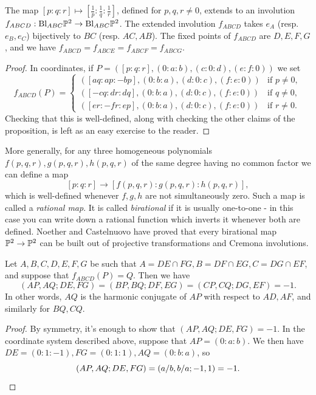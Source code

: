 \begin{prop} The map $[p:q:r]\mapsto [\frac{1}{p}:\frac{1}{q}:\frac{1}{r}]$, defined for $p,q,r \ne 0$, extends to an involution $f_{ABCD} : \text{\rm Bl}_{ABC}\mathbb{P}^2 \rightarrow \text{\rm Bl}_{ABC}\mathbb{P}^2$. The extended involution $f_{ABCD}$ takes $e_A$ (resp. $e_B, e_C$) bijectively to $BC$ (resp. $AC, AB$). The fixed points of $f_{ABCD}$ are $D,E,F,G$, and we have $f_{ABCD} = f_{ABCE} = f_{ABCF} = f_{ABCG}$.
\end{prop}
\begin{proof} In coordinates, if $P = ([p:q:r],(0:a:b),(c:0:d),(e:f:0))$ we set
\[
f_{ABCD}(P) = \begin{cases}([aq:ap:-bp],(0:b:a),(d:0:c),(f:e:0)) & \mbox{if }p\ne 0,\\([-cq:dr:dq],(0:b:a),(d:0:c),(f:e:0)) & \mbox{if }q\ne 0,\\ ([er:-fr:ep],(0:b:a),(d:0:c),(f:e:0)) & \mbox{if }r\ne 0.\end{cases}
\]
Checking that this is well-defined, along with checking the other claims of the proposition, is left as an easy exercise to the reader.
\end{proof}

\begin{rem} More generally, for any three homogeneous polynomials $f(p,q,r),g(p,q,r),h(p,q,r)$ of the same degree having no common factor we can define a map
\[
[p:q:r] \rightarrow [f(p,q,r):g(p,q,r):h(p,q,r)],
\]
which is well-defined whenever $f,g,h$ are not simultaneously zero. Such a map is called a \emph{rational map}. It is called \emph{birational} if it is usually one-to-one - in this case you can write down a rational function which inverts it whenever both are defined. Noether and Castelnuovo have proved that every birational map $\mathbb{P}^2\rightarrow \mathbb{P}^2$ can be built out of projective transformations and Cremona involutions.
\end{rem}

\begin{prop} Let $A,B,C,D,E,F,G$ be such that $A = DE\cap FG, B = DF\cap EG, C = DG\cap EF$, and suppose that $f_{ABCD}(P) = Q$. Then we have
\[
(AP,AQ;DE,FG) = (BP,BQ;DF,EG) = (CP,CQ;DG,EF) = -1.
\]
In other words, $AQ$ is the harmonic conjugate of $AP$ with respect to $AD, AF$, and similarly for $BQ, CQ$.
\end{prop}
\begin{proof} By symmetry, it's enough to show that $(AP,AQ;DE,FG) = -1$. In the coordinate system described above, suppose that $AP = (0:a:b)$. We then have $DE = (0:1:-1), FG = (0:1:1), AQ = (0:b:a)$, so
\[
(AP,AQ;DE,FG) = (a/b,b/a;-1,1) = -1.\qedhere
\]
\end{proof}


